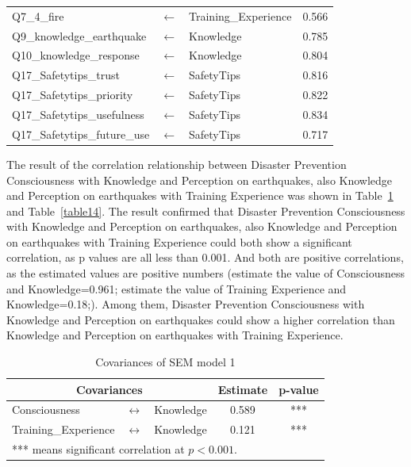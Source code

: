 \begin{table}[h]
\begin{tabular}{lcl|c}
Q7\_4\_fire             &$\longleftarrow$ & Training\_Experience & 0.566  \\
Q9\_knowledge\_earthquake                      &$\longleftarrow$ & Knowledge            & 0.785  \\
Q10\_knowledge\_response                     &$\longleftarrow$ & Knowledge            & 0.804  \\
Q17\_Safetytips\_trust &$\longleftarrow$ & SafetyTips           & 0.816  \\
Q17\_Safetytips\_priority &$\longleftarrow$ & SafetyTips           & 0.822  \\
Q17\_Safetytips\_usefulness &$\longleftarrow$ & SafetyTips           & 0.834  \\
Q17\_Safetytips\_future\_use &$\longleftarrow$ & SafetyTips           & 0.717  \\
 \hline
  \end{tabular}
\end{table}

The result of the correlation relationship between Disaster Prevention Consciousness with Knowledge and Perception on earthquakes, also Knowledge and Perception on earthquakes with Training Experience was shown in Table~\ref{table13} and Table~\ref{table14}. The result confirmed that Disaster Prevention Consciousness with Knowledge and Perception on earthquakes, also Knowledge and Perception on earthquakes with Training Experience could both show a significant correlation, as p values are all less than 0.001. And both are positive correlations, as the estimated values are positive numbers (estimate the value of Consciousness and Knowledge=0.961; estimate the value of Training Experience and Knowledge=0.18;). Among them, Disaster Prevention Consciousness with Knowledge and Perception on earthquakes could show a higher correlation than Knowledge and Perception on earthquakes with Training Experience. 

\begin{table}[h]
  \caption{Covariances of SEM model 1}
  \label{table13}
  \centering
  \begin{tabular}{lcl|c|c}
  \hline
   \multicolumn{3}{c|}{Covariances} & Estimate & p-value \\
  \hline
  Consciousness & $\longleftrightarrow$ & Knowledge & 0.589 & *** \\
  Training\_Experience & $\longleftrightarrow$ & Knowledge & 0.121 & *** \\
  \hline
\multicolumn{5}{l}{*** means significant correlation at $p<0.001$.}
  \end{tabular}
\end{table}

